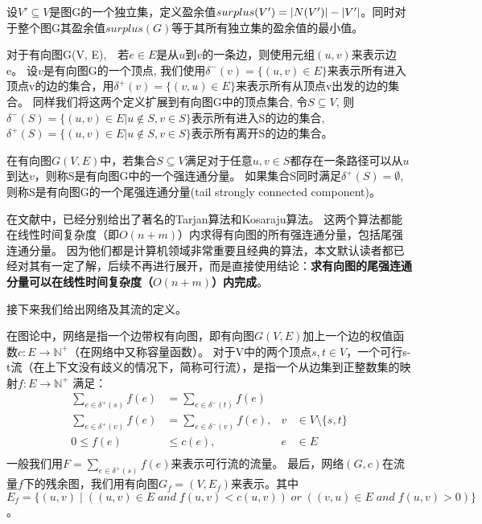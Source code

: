设$V' \subseteq V$是图G的一个独立集，定义盈余值$surplus(V') = \left\vert N(V') \right\vert - \left\vert V' \right\vert$。同时对于整个图G其盈余值$surplus(G)$等于其所有独立集的盈余值的最小值。

对于有向图G(V, E),　若$e \in E$是从$u$到$v$的一条边，则使用元组$(u, v)$来表示边e。
设$v$是有向图G的一个顶点, 我们使用$\delta^-(v)=\{(u, v) \in E\}$来表示所有进入顶点v的边的集合，用$\delta^+(v)=\{(v, u) \in E\}$来表示所有从顶点v出发的边的集合。
同样我们将这两个定义扩展到有向图G中的顶点集合, 令$S \subseteq V$, 则$\delta^-(S)=\{(u, v) \in E | u \notin S, v \in S\}$表示所有进入S的边的集合,
$\delta^+(S)=\{(u, v) \in E | u \notin S, v \in S\}$表示所有离开S的边的集合。

\begin{definition}
在有向图$G(V, E)$中，若集合$S \subseteq V$满足对于任意$u, v \in S$都存在一条路径可以从$u$到达$v$，则称S是有向图G中的一个强连通分量。
如果集合S同时满足$\delta^+(S) = \emptyset$, 则称S是有向图G的一个尾强连通分量(tail strongly connected component)。
\end{definition}

在文献\cite{tarjan1972depth,sharir1981strong}中，已经分别给出了著名的Tarjan算法和Kosaraju算法。
这两个算法都能在线性时间复杂度（即$O(n + m)$）内求得有向图的所有强连通分量，包括尾强连通分量。
因为他们都是计算机领域非常重要且经典的算法，本文默认读者都已经对其有一定了解，后续不再进行展开，而是直接使用结论：\textbf{求有向图的尾强连通分量可以在线性时间复杂度（$O(n + m)$）内完成}。

接下来我们给出网络及其流的定义。

在图论中，网络是指一个边带权有向图，即有向图$G(V, E)$加上一个边的权值函数$c: E \rightarrow \mathbb{N}^+$（在网络中又称容量函数）。
对于V中的两个顶点$s, t \in V$，一个可行s-t流（在上下文没有歧义的情况下，简称可行流），是指一个从边集到正整数集的映射$f: E \rightarrow \mathbb{N}^+$ 满足：
\begin{equation} \begin{aligned}  
  \sum_{e\in \delta^+(s)}{f(e)}&=\sum_{e\in \delta^-(t)}{f(e)}& \\
  \sum_{e\in \delta^+(v)}{f(e)}&=\sum_{e\in \delta^-(v)}{f(e)}, & v &\in V \setminus \{s, t\} \\
  0 \le f(e) &\le c(e), & e &\in E \\
\end{aligned} \end{equation}
一般我们用$F=\sum_{e\in \delta^+(s)}{f(e)}$来表示可行流的流量。
最后，网络$(G, c)$在流量$f$下的残余图，我们用有向图$G_f = (V, E_f)$来表示。其中$E_f = \{(u,v)\;|\;((u, v) \in E\;and\;f(u, v) < c(u, v))\;or\;((v, u) \in E\;and\;f(u, v) > 0)\}$。

